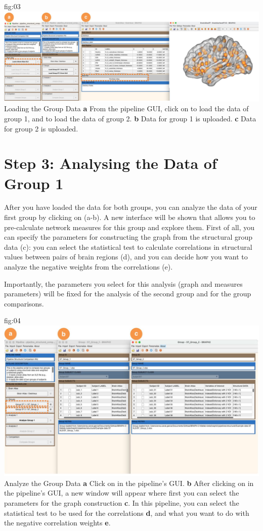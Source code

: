 \documentclass[justified]{tufte-handout}
\begin{document}
	{fig:03}
	{
	\includegraphics{fig03.jpg}
	}
	{Loading the Group Data}
	{
	{\bf a} From the pipeline GUI, click on  to load the data of group 1, and  to load the data of group 2.
	{\bf b} Data for group 1 is uploaded. {\bf c} Data for group 2 is uploaded.
	}

\section{Step 3: Analysing the Data of Group 1}
 
After you have loaded the data for both groups, you can analyze the data of your first group by clicking on  (a-b). A new interface will be shown that allows you to pre-calculate network measures for this group and explore them. First of all, you can specify the parameters for constructing the graph from the structural group data (c): you can select the statistical test to calculate correlations in structural values between pairs of brain regions (d), and you can decide how you want to analyze the negative weights from the correlations (e). 

Importantly, the parameters you select for this analysis (graph and measures parameters) will be fixed for the analysis of the second group and for the group comparisons.

	{fig:04}
	{
	\includegraphics{fig04.jpg}
	}
	{Analyze the Group Data}
	{
	{\bf a} Click on  in the pipeline's GUI.
        {\bf b} After clicking on  in the pipeline's GUI, a new window will appear where first you can select the parameters for the graph construction {\bf c}. In this pipeline, you can select the statistical test to be used for the correlations {\bf d}, and what you want to do with the negative correlation weights {\bf e}.
	}
\end{document}
